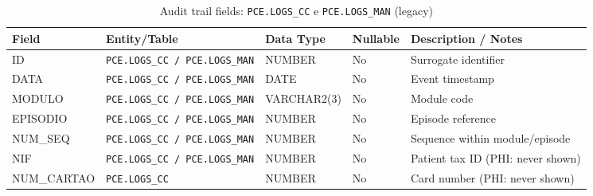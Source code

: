 \begin{table}[H]
    \centering
    \caption{Audit trail fields: \texttt{PCE.LOGS\_CC} e \texttt{PCE.LOGS\_MAN} (legacy)}
    \label{tab:audit_logs_cc_man_fields}
    {\setlength{\tabcolsep}{3pt}\scriptsize\renewcommand{\arraystretch}{1.15}
    \begin{tabularx}{\textwidth}{@{}>{\raggedright\arraybackslash}p{3.2cm} >{\raggedright\arraybackslash}p{3.0cm} >{\raggedright\arraybackslash}p{2.2cm} >{\centering\arraybackslash}p{1.7cm} >{\raggedright\arraybackslash}X@{}}
        \toprule
        \textbf{Field} & \textbf{Entity/Table} & \textbf{Data Type} & \textbf{Nullable} & \textbf{Description / Notes} \\
        \midrule
        ID & \texttt{PCE.LOGS\_CC / PCE.LOGS\_MAN} & NUMBER & No & Surrogate identifier \\
        DATA & \texttt{PCE.LOGS\_CC / PCE.LOGS\_MAN} & DATE & No & Event timestamp \\
        MODULO & \texttt{PCE.LOGS\_CC / PCE.LOGS\_MAN} & VARCHAR2(3) & No & Module code \\
        EPISODIO & \texttt{PCE.LOGS\_CC / PCE.LOGS\_MAN} & NUMBER & No & Episode reference \\
        NUM\_SEQ & \texttt{PCE.LOGS\_CC / PCE.LOGS\_MAN} & NUMBER & No & Sequence within module/episode \\
        NIF & \texttt{PCE.LOGS\_CC / PCE.LOGS\_MAN} & NUMBER & No & Patient tax ID (PHI: never shown) \\
        NUM\_CARTAO & \texttt{PCE.LOGS\_CC} & NUMBER & No & Card number (PHI: never shown) \\
        \bottomrule
    \end{tabularx}}
\end{table}

